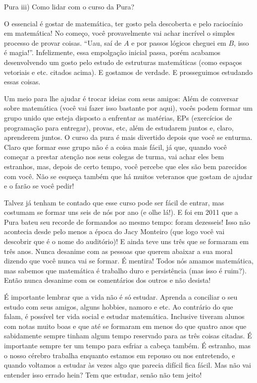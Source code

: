 \begin{subsecao}{Pura}
iii) Como lidar com o curso da Pura?

O essencial é gostar de matemática, ter gosto pela descoberta e pelo raciocínio
em matemática! No começo, você provavelmente vai achar incrível o simples processo
de provar coisas. ``Uau, saí de $A$ e por passos lógicos cheguei em $B$, isso é
magia!''. Infelizmente, essa empolgação inicial passa, porém acabamos desenvolvendo
um gosto pelo estudo de estruturas matemáticas (como espaços vetoriais e etc.
citados acima). E gostamos de verdade. E prosseguimos estudando essas coisas.

Um meio para lhe ajudar é trocar ideias com seus amigos: Além de conversar
sobre matemática (você vai fazer isso bastante por aqui), vocês podem formar um
grupo unido que esteja disposto a enfrentar as matérias, EPs (exercícios de
programação para entregar), provas, etc, além de estudarem juntos e, claro,
aprenderem juntos. O curso da pura é mais divertido depois que você se enturma. Claro que
formar esse grupo não é a coisa mais fácil, já que, quando você começar a
prestar atenção nos seus colegas de turma, vai achar eles bem estranhos, mas,
depois de certo tempo, você percebe que eles são bem parecidos com você. Não se
esqueça também que há muitos veteranos que gostam de ajudar e o farão se você pedir!

Talvez já tenham te contado que esse curso pode ser fácil de entrar, mas
costumam se formar uns seis de nós por ano (e olhe lá!). E foi em 2011 que a Pura
bateu seu recorde de formandos ao mesmo tempo: foram dezesseis! Isso não acontecia
desde pelo menos a época do Jacy Monteiro (que logo você vai descobrir que é o
nome do auditório)! E ainda teve uns três que se formaram em
três anos. Nunca desanime com as pessoas que querem abaixar a sua moral dizendo
que você nunca vai se formar. É mentira! Todos nós amamos matemática, mas sabemos
que matemática é trabalho duro e persistência (mas isso é ruim?). Então nunca
desanime com os comentários dos outros e não desista!

É importante lembrar que a vida não é só estudar. Aprenda a conciliar o seu estudo
com seus amigos, alguns hobbies, namoro e etc. Ao contrário do que falam, é
possível ter vida social e estudar matemática. Inclusive tiveram alunos com notas
muito boas e que até se formaram em menos do que quatro anos que sabidamente
sempre tinham algum tempo reservado para as três coisas citadas. É importante
sempre ter um tempo para esfriar a cabeça também. É estranho, mas o nosso cérebro
trabalha enquanto estamos em repouso ou nos entretendo, e quando voltamos a estudar
às vezes algo que parecia difícil fica fácil. Mas não vai entender isso errado
hein? Tem que estudar, senão não tem jeito!


\end{subsecao}
